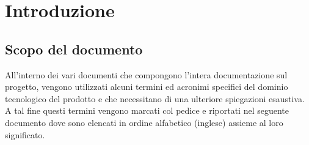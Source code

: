 \section{Introduzione}

\subsection{Scopo del documento}
All'interno dei vari documenti che compongono l'intera documentazione sul progetto, vengono utilizzati alcuni termini ed acronimi specifici del dominio tecnologico del prodotto e che necessitano di una ulteriore spiegazioni esaustiva. A tal fine questi termini vengono marcati col pedice  e riportati nel seguente documento dove sono elencati in ordine alfabetico (inglese) assieme al loro significato.

